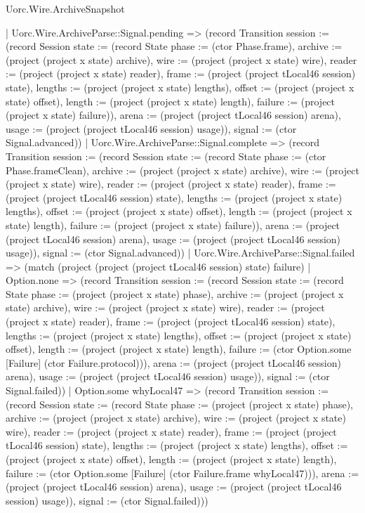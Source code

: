 \begin{lexlean}{Uorc.Wire.ArchiveSnapshot}
\begin{semanticmodule}
{        | Uorc.Wire.ArchiveParse::Signal.pending => (record Transition {session := (record Session {state := (record State {phase := (ctor Phase.frame), archive := (project (project x state) archive), wire := (project (project x state) wire), reader := (project (project x state) reader), frame := (project (project tLocal46 session) state), lengths := (project (project x state) lengths), offset := (project (project x state) offset), length := (project (project x state) length), failure := (project (project x state) failure)}), arena := (project (project tLocal46 session) arena), usage := (project (project tLocal46 session) usage)}), signal := (ctor Signal.advanced)})
        | Uorc.Wire.ArchiveParse::Signal.complete => (record Transition {session := (record Session {state := (record State {phase := (ctor Phase.frameClean), archive := (project (project x state) archive), wire := (project (project x state) wire), reader := (project (project x state) reader), frame := (project (project tLocal46 session) state), lengths := (project (project x state) lengths), offset := (project (project x state) offset), length := (project (project x state) length), failure := (project (project x state) failure)}), arena := (project (project tLocal46 session) arena), usage := (project (project tLocal46 session) usage)}), signal := (ctor Signal.advanced)})
        | Uorc.Wire.ArchiveParse::Signal.failed => (match (project (project (project tLocal46 session) state) failure)
          | Option.none => (record Transition {session := (record Session {state := (record State {phase := (project (project x state) phase), archive := (project (project x state) archive), wire := (project (project x state) wire), reader := (project (project x state) reader), frame := (project (project tLocal46 session) state), lengths := (project (project x state) lengths), offset := (project (project x state) offset), length := (project (project x state) length), failure := (ctor Option.some [Failure] (ctor Failure.protocol))}), arena := (project (project tLocal46 session) arena), usage := (project (project tLocal46 session) usage)}), signal := (ctor Signal.failed)})
          | Option.some whyLocal47 => (record Transition {session := (record Session {state := (record State {phase := (project (project x state) phase), archive := (project (project x state) archive), wire := (project (project x state) wire), reader := (project (project x state) reader), frame := (project (project tLocal46 session) state), lengths := (project (project x state) lengths), offset := (project (project x state) offset), length := (project (project x state) length), failure := (ctor Option.some [Failure] (ctor Failure.frame whyLocal47))}), arena := (project (project tLocal46 session) arena), usage := (project (project tLocal46 session) usage)}), signal := (ctor Signal.failed)}))
}
\end{semanticmodule}
\end{lexlean}
